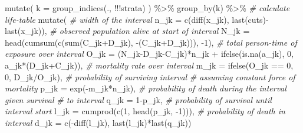 \documentclass[10pt,twoside,reqno]{article}
\newenvironment{Shaded}{}{}
\newcommand{\AttributeTok}[1]{#1}
\newcommand{\CommentTok}[1]{\textit{#1}}
\newcommand{\DecValTok}[1]{#1}
\newcommand{\FunctionTok}[1]{#1}
\newcommand{\NormalTok}[1]{#1}
\newcommand{\SpecialCharTok}[1]{#1}
\begin{document}
\begin{Shaded}
\begin{Highlighting}[]
    \FunctionTok{mutate}\NormalTok{(}
      \AttributeTok{k =} \FunctionTok{group\_indices}\NormalTok{(., }\SpecialCharTok{!!!}\NormalTok{strata)}
\NormalTok{    ) }\SpecialCharTok{\%\textgreater{}\%}
    \FunctionTok{group\_by}\NormalTok{(k) }\SpecialCharTok{\%\textgreater{}\%}
    \CommentTok{\# calculate life{-}table}
    \FunctionTok{mutate}\NormalTok{(}
      \CommentTok{\# width of the interval}
      \AttributeTok{n\_jk =}
        \FunctionTok{c}\NormalTok{(}\FunctionTok{diff}\NormalTok{(x\_jk), }\FunctionTok{last}\NormalTok{(cuts)}\SpecialCharTok{{-}}\FunctionTok{last}\NormalTok{(x\_jk)),}
      \CommentTok{\# observed population alive at start of interval}
      \AttributeTok{N\_jk =}
        \FunctionTok{head}\NormalTok{(}\FunctionTok{cumsum}\NormalTok{(}\FunctionTok{c}\NormalTok{(}\FunctionTok{sum}\NormalTok{(C\_jk}\SpecialCharTok{+}\NormalTok{D\_jk), }\SpecialCharTok{{-}}\NormalTok{(C\_jk}\SpecialCharTok{+}\NormalTok{D\_jk))), }\SpecialCharTok{{-}}\DecValTok{1}\NormalTok{),}
      \CommentTok{\# total person{-}time of exposure over interval}
      \AttributeTok{O\_jk =}
\NormalTok{        (N\_jk}\SpecialCharTok{{-}}\NormalTok{D\_jk}\SpecialCharTok{{-}}\NormalTok{C\_jk)}\SpecialCharTok{*}\NormalTok{n\_jk }\SpecialCharTok{+}
        \FunctionTok{ifelse}\NormalTok{(}\FunctionTok{is.na}\NormalTok{(a\_jk), }\DecValTok{0}\NormalTok{, a\_jk}\SpecialCharTok{*}\NormalTok{(D\_jk}\SpecialCharTok{+}\NormalTok{C\_jk)),}
      \CommentTok{\# mortality rate over interval}
      \AttributeTok{m\_jk =}
        \FunctionTok{ifelse}\NormalTok{(O\_jk }\SpecialCharTok{==} \DecValTok{0}\NormalTok{, }\DecValTok{0}\NormalTok{, D\_jk}\SpecialCharTok{/}\NormalTok{O\_jk),}
      \CommentTok{\# probability of surviving interval}
      \CommentTok{\# assuming constant force of mortality}
      \AttributeTok{p\_jk =}
        \FunctionTok{exp}\NormalTok{(}\SpecialCharTok{{-}}\NormalTok{m\_jk}\SpecialCharTok{*}\NormalTok{n\_jk),}
      \CommentTok{\# probability of death during the interval given survival}
      \CommentTok{\# to interval}
      \AttributeTok{q\_jk =}
        \DecValTok{1}\SpecialCharTok{{-}}\NormalTok{p\_jk,}
      \CommentTok{\# probability of survival until interval start}
      \AttributeTok{l\_jk =}
        \FunctionTok{cumprod}\NormalTok{(}\FunctionTok{c}\NormalTok{(}\DecValTok{1}\NormalTok{, }\FunctionTok{head}\NormalTok{(p\_jk, }\SpecialCharTok{{-}}\DecValTok{1}\NormalTok{))),}
      \CommentTok{\# probability of death in interval}
      \AttributeTok{d\_jk =}
        \FunctionTok{c}\NormalTok{(}\SpecialCharTok{{-}}\FunctionTok{diff}\NormalTok{(l\_jk), }\FunctionTok{last}\NormalTok{(l\_jk)}\SpecialCharTok{*}\FunctionTok{last}\NormalTok{(q\_jk))}

\end{Highlighting}
\end{Shaded}
\end{document}

